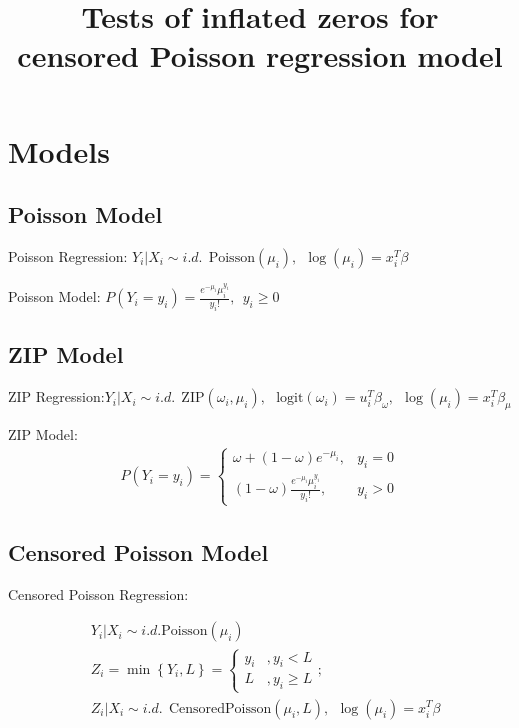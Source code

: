 \documentclass[11pt]{article}
\date{}
\numberwithin{equation}{section}
\begin{document}
\title{\textbf{Tests of inflated zeros for \\ censored Poisson regression model}}
\maketitle

\section{Models}
\label{sec1}

\subsection{Poisson Model} \label{sec1-1}

Poisson Regression:
            \:\:$Y_i|X_i \sim i.d. \:\: \mbox{Poisson}(\mu_i),\:\: \log(\mu_i)=x_i^T\beta$

Poisson Model:
            \:\:$P(Y_i=y_i)=\frac{e^{-\mu_i}\mu_i^{y_i}}{y_i!},\:\: y_i \ge 0$

\subsection{ZIP Model} \label{sec1-2}
ZIP Regression:\:\:$Y_i|X_i \sim i.d. \:\: \mbox{ZIP}(\omega_i,\mu_i),\:\:\ \mbox{logit}(\omega_i)= u^T_i \beta_{\omega},\:\: \log(\mu_i)=x^T_i\beta_{\mu}$

ZIP Model:
\begin{align}
P(Y_i=y_i)=\left\{
                \begin{array}{cc}
                    \omega+(1-\omega)e^{-\mu_i}, & y_i=0 \\
                    (1-\omega)\frac{e^{-\mu_i}\mu_i^{y_i}}{y_i!},  & y_i>0
                \end{array}
            \right. 
\end{align}

\subsection{Censored Poisson Model} \label{sec1-3}
Censored Poisson Regression:

\begin{align}
     &Y_i| X_i \sim i.d. \mbox{Poisson}(\mu_i)  \nonumber\\
     &Z_i = \min\left\{Y_i,L\right\}=\left\{
                \begin{array}{cc}
                    y_i &,y_i < L  \\
                    L&,y_i \ge L
                \end{array} \right.;\nonumber\\
     &Z_i | X_i \sim i.d. \:\: \mbox{CensoredPoisson}(\mu_i,L),\:\: \log(\mu_i)=x_i^T\beta 
\end{align}
\end{document}
